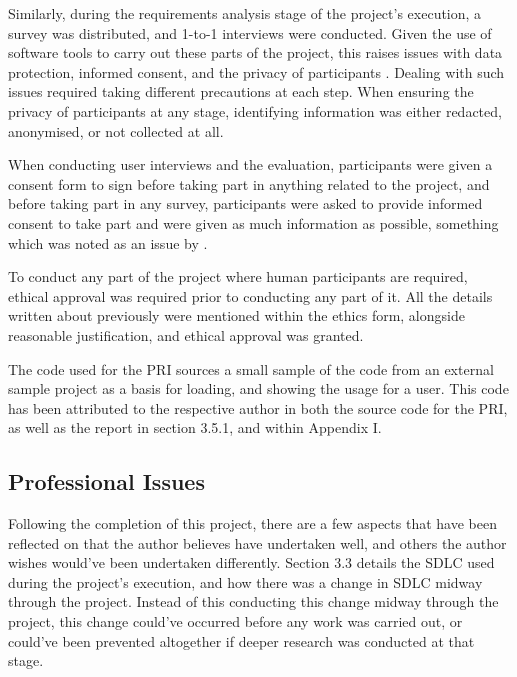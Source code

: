 \documentclass[12pt]{article}
\begin{document}
Similarly, during the requirements analysis stage of the project's execution, a survey was distributed, and 1-to-1 interviews were 
conducted. Given the use of software tools to carry out these parts of the project, this raises issues with data protection, informed 
consent, and the privacy of participants \autocite{davepregoner:hal-05073466}. Dealing with such issues required taking different precautions 
at each step. When ensuring the privacy of participants at any stage, identifying information was either redacted, anonymised, or not 
collected at all. \newline

When conducting user interviews and the evaluation, participants were given a consent form to sign before taking part in anything related 
to the project, and before taking part in any survey, participants were asked to provide informed consent to take part and were given as 
much information as possible, something which was noted as an issue by \textcite{davepregoner:hal-05073466}. \newline

To conduct any part of the project where human participants are required, ethical approval was required prior to conducting any part of it.
All the details written about previously were mentioned within the ethics form, alongside reasonable 
justification, and ethical approval was granted.

The code used for the PRI sources a small sample of the code from an external sample project as a basis for loading, and showing the usage for
a user. This code has been attributed to the respective author in both the source code for the PRI, as well as the report in section 3.5.1, and
within Appendix I.

\subsection{Professional Issues}
Following the completion of this project, there are a few aspects that have been reflected on that the author believes have undertaken well, and
others the author wishes would've been undertaken differently. Section 3.3 details the SDLC used during the project's execution, and 
how there was a change in SDLC midway through the project. Instead of this conducting this change midway through the project, this change 
could've occurred before any work was carried out, or could've been prevented altogether if deeper research was conducted at that stage. \newline
\end{document}

